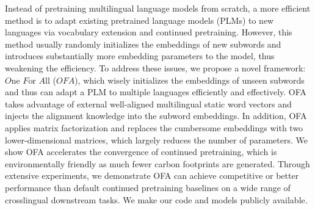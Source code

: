 Instead of pretraining multilingual language models from scratch, a more efficient method is to adapt existing pretrained language models (PLMs) to new languages via vocabulary extension and continued pretraining. However, this method usually randomly initializes the embeddings of new subwords and introduces substantially more embedding parameters to the model, thus weakening the efficiency. To address these issues, we propose a novel framework: ${O}$ne ${F}$or ${A}$ll (${OFA}$), which wisely initializes the embeddings of unseen subwords and thus can adapt a PLM to multiple languages efficiently and effectively. OFA takes advantage of external well-aligned multilingual static word vectors and injects the alignment knowledge into the subword embeddings. In addition, OFA applies matrix factorization and replaces the cumbersome embeddings with two lower-dimensional matrices, which largely reduces the number of parameters. We show OFA accelerates the convergence of continued pretraining, which is environmentally friendly as much fewer carbon footprints are generated. Through extensive experiments, we demonstrate OFA can achieve competitive or better performance than default continued pretraining baselines on a wide range of crosslingual downstream tasks. We make our code and models publicly available.
